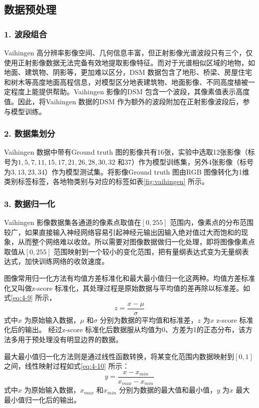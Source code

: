 \subsection{数据预处理}
\label{sec:second-2}

\subsubsection*{1. 波段组合}
Vaihingen 高分辨率影像空间、几何信息丰富，但正射影像光谱波段只有三个，仅使用正射影像数据无法完备有效地提取影像特征。而对于光谱相似区域的地物，如地面、建筑物、阴影等，更加难以区分，DSM 数据包含了地形、桥梁、房屋住宅和树木等高度地面高程信息，对模型区分地表建筑物、地面影像、不同高度植被一定程度上能提供帮助。Vaihingen 影像的DSM 包含一个波段，其像素值表示高度值。因此，将Vaihingen 数据的DSM 作为额外的波段附加在正射影像波段后，参与模型训练。

\subsubsection*{2. 数据集划分}
Vaihingen 数据中带有Ground truth 图的影像共有16张，实验中选取12张影像（标号为$1,5,7,11,15,17,21,26,28,30,32$ 和$37$）作为模型训练集，另外4张影像（标号为$3,13,23,34$）作为模型测试集。将影像Ground truth 图由RGB 图像转化为1维类别标签标签，各地物类别与对应的标签如表\ref{fig:vaihingen} 所示。

\subsubsection*{3. 数据归一化}
Vaihingen 影像数据集各通道的像素点取值在$[0,255]$ 范围内，像素点的分布范围较广，如果直接输入神经网络容易引起神经元输出因输入绝对值过大而饱和的现象，从而整个网络难以收敛。所以需要对图像数据做归一化处理，即将图像像素点取值从$[0,255]$ 范围映射到一个较小的变化范围，把有量纲表达式变为无量纲表达式，加快训练网络的收敛速度。

图像常用归一化方法有均值方差标准化和最大最小值归一化这两种。均值方差标准化又叫做z-score 标准化，其处理过程是原始数据与平均值的差再除以标准差。如式\ref{eq:4-9} 所示，
\begin{equation}
  \label{eq:4-9}
  z = \frac{x-\mu}{\sigma}
\end{equation}
式中$x$ 为原始输入数据，$\mu$ 和$\sigma$ 分别为数据的平均值和标准差，$z$ 为$x$ z-score 标准化后的输出。 经过z-score 标准化后数据服从均值为0、方差为1的正态分布，该方法多用于预处理没有明显边界的数据。

最大最小值归一化方法则是通过线性函数转换，将某变化范围内数据映射到$[0,1]$ 之间，线性映射过程如式\ref{eq:4-10} 所示：
\begin{equation}
  \label{eq:4-10}
  y = \frac{x-x_{min}}{x_{max}-x_{min}}
\end{equation}
式中$x$ 为原始输入数据，$x_{max}$ 和$x_{min}$ 分别为数据的最大值和最小值，$y$ 为$x$ 最大最小值归一化后的输出。

